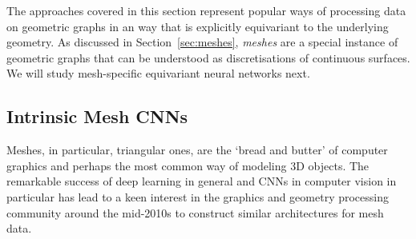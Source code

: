 The approaches covered in this section represent popular ways of processing data on geometric graphs in an way that is explicitly equivariant to the underlying geometry. As discussed in Section~\ref{sec:meshes}, \emph{meshes} are a special instance of geometric graphs %
that can be understood as discretisations of continuous surfaces. 
We will study mesh-specific equivariant neural networks next.


\subsection{Intrinsic Mesh CNNs}
Meshes, in particular, triangular ones, are the `bread and butter' of computer graphics and perhaps the most common way of modeling 3D objects. The remarkable success of deep learning in general and CNNs in computer vision in particular has lead to a keen interest in the graphics and geometry processing  community around the mid-2010s to construct similar architectures for mesh data. 



